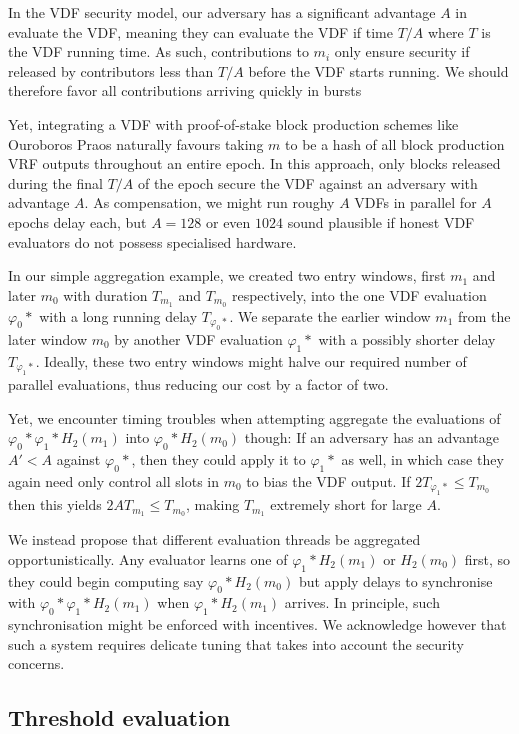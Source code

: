\documentclass{article}
\begin{document}
In the VDF security model, our adversary has a significant advantage
$A$ in evaluate the VDF, meaning they can evaluate the VDF if time
$T/A$ where $T$ is the VDF running time.  As such, contributions to
$m_i$ only ensure security if released by contributors less than
$T/A$ before the VDF starts running.  We should therefore favor all
contributions arriving quickly in bursts

Yet, integrating a VDF with proof-of-stake block production schemes
like Ouroboros Praos naturally favours taking $m$ to be a hash of
all block production VRF outputs throughout an entire epoch. 
In this approach, only blocks released during the final $T/A$ of the
epoch secure the VDF against an adversary with advantage $A$.
As compensation, we might run roughy $A$ VDFs in parallel for $A$
epochs delay each, but $A = 128$ or even $1024$ sound plausible if
honest VDF evaluators do not possess specialised hardware.

In our simple aggregation example, we created two entry windows,
first $m_1$ and later $m_0$ with duration $T_{m_1}$ and $T_{m_0}$
respectively, into the one VDF evaluation $φ_0*$ with a long running
delay $T_{φ_0*}$.  We separate the earlier window $m_1$ from the later
window $m_0$ by another VDF evaluation $φ_1*$ with a possibly shorter
delay $T_{φ_1*}$.  Ideally, these two entry windows might halve our
required number of parallel evaluations, thus reducing our cost by a
factor of two. 

Yet, we encounter timing troubles when attempting aggregate the
evaluations of $φ_0* φ_1* H_2(m_1)$ into $φ_0* H_2(m_0)$ though:  
If an adversary has an advantage $A' < A$ against $φ_0*$, then they
could apply it to $φ_1*$ as well, in which case they again need only
control all slots in $m_0$ to bias the VDF output.  
If $2 T_{φ_1*} \leq T_{m_0}$ then this yields $2 A T_{m_1} \leq T_{m_0}$,
making $T_{m_1}$ extremely short for large $A$.  

We instead propose that different evaluation threads be aggregated
opportunistically.  Any evaluator learns one of $φ_1* H_2(m_1)$ or
$H_2(m_0)$ first, so they could begin computing say $φ_0* H_2(m_0)$
but apply delays to synchronise with $φ_0* φ_1* H_2(m_1)$ when 
$φ_1* H_2(m_1)$ arrives.  In principle, such synchronisation might
be enforced with incentives.  We acknowledge however that such a
system requires delicate tuning that takes into account the
security concerns.  

\subsection{Threshold evaluation}
\end{document}

